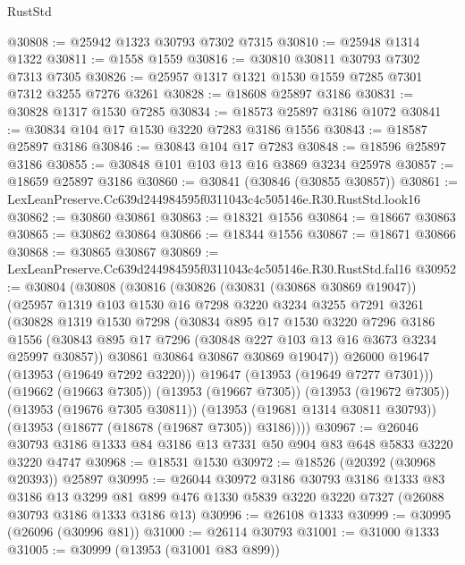 \begin{lexlean}{RustStd}
\begin{coremodule}
@30808 := @25942 @1323 @30793 @7302 @7315
@30810 := @25948 @1314 @1322
@30811 := @1558 @1559
@30816 := @30810 @30811 @30793 @7302 @7313 @7305
@30826 := @25957 @1317 @1321 @1530 @1559 @7285 @7301 @7312 @3255 @7276 @3261
@30828 := @18608 @25897 @3186
@30831 := @30828 @1317 @1530 @7285
@30834 := @18573 @25897 @3186 @1072
@30841 := @30834 @104 @17 @1530 @3220 @7283 @3186 @1556
@30843 := @18587 @25897 @3186
@30846 := @30843 @104 @17 @7283
@30848 := @18596 @25897 @3186
@30855 := @30848 @101 @103 @13 @16 @3869 @3234 @25978
@30857 := @18659 @25897 @3186
@30860 := @30841 (@30846 (@30855 @30857))
@30861 := LexLeanPreserve.Cc639d244984595f0311043c4c505146e.R30.RustStd.look16
@30862 := @30860 @30861
@30863 := @18321 @1556
@30864 := @18667 @30863
@30865 := @30862 @30864
@30866 := @18344 @1556
@30867 := @18671 @30866
@30868 := @30865 @30867
@30869 := LexLeanPreserve.Cc639d244984595f0311043c4c505146e.R30.RustStd.fal16
@30952 := @30804
    (@30808
      (@30816
        (@30826
          (@30831 (@30868 @30869 @19047))
          (@25957
            @1319
            @103
            @1530
            @16
            @7298
            @3220
            @3234
            @3255
            @7291
            @3261
            (@30828
              @1319
              @1530
              @7298
              (@30834
                @895
                @17
                @1530
                @3220
                @7296
                @3186
                @1556
                (@30843 @895 @17 @7296 (@30848 @227 @103 @13 @16 @3673 @3234 @25997 @30857))
                @30861
                @30864
                @30867
                @30869
                @19047))
            @26000
            @19647
            (@13953 (@19649 @7292 @3220)))
          @19647
          (@13953 (@19649 @7277 @7301)))
        (@19662 (@19663 @7305))
        (@13953 (@19667 @7305))
        (@13953 (@19672 @7305))
        (@13953 (@19676 @7305 @30811))
        (@13953 (@19681 @1314 @30811 @30793))
        (@13953 (@18677 (@18678 (@19687 @7305)) @3186))))
@30967 := @26046 @30793 @3186 @1333 @84 @3186 @13 @7331 @50 @904 @83 @648 @5833 @3220 @3220 @4747
@30968 := @18531 @1530
@30972 := @18526 (@20392 (@30968 @20393)) @25897
@30995 := @26044
    @30972
    @3186
    @30793
    @3186
    @1333
    @83
    @3186
    @13
    @3299
    @81
    @899
    @476
    @1330
    @5839
    @3220
    @3220
    @7327
    (@26088 @30793 @3186 @1333 @3186 @13)
@30996 := @26108 @1333
@30999 := @30995 (@26096 (@30996 @81))
@31000 := @26114 @30793
@31001 := @31000 @1333
@31005 := @30999 (@13953 (@31001 @83 @899))

\end{coremodule}
\end{lexlean}
